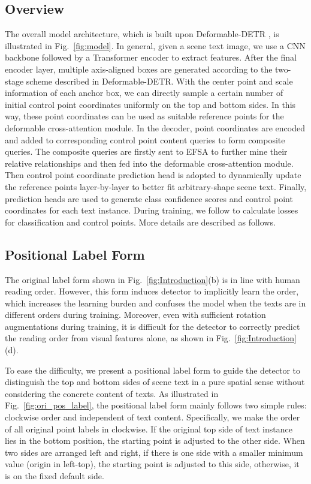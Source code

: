 \documentclass[letterpaper]{article} \usepackage{aaai23}  \usepackage{times}  \usepackage{helvet}  \usepackage{courier}  \usepackage[hyphens]{url}  \usepackage{graphicx} \urlstyle{rm}
\begin{document}
\subsection{Overview}
The overall model architecture, which is built upon Deformable-DETR \cite{zhu2020deformable}, is illustrated in Fig.~\ref{fig:model}. In general, given a scene text image, we use a CNN backbone followed by a Transformer encoder to extract features.
After the final encoder layer, multiple axis-aligned boxes are generated according to the two-stage scheme described in Deformable-DETR. With the center point and scale information of each anchor box, we can directly sample a certain number of initial control point coordinates uniformly on the top and bottom sides. In this way, these point coordinates can be used as suitable reference points for the deformable cross-attention module.
In the decoder, point coordinates are encoded and added to corresponding control point content queries to form composite queries. The composite queries are firstly sent to EFSA to further mine their relative relationships and then fed into the deformable cross-attention module. Then control point coordinate prediction head is adopted to dynamically update the reference points layer-by-layer to better fit arbitrary-shape scene text. Finally, prediction heads are used to generate class confidence scores and  control point coordinates for each text instance. During training, we follow \cite{zhang2022text} to calculate losses for classification and control points. More details are described as follows.

\subsection{Positional Label Form}
\label{pos.label}
The original label form shown in Fig.~\ref{fig:Introduction}(b) is in line with human reading order. However, this form induces detector to implicitly learn the order, which increases the learning burden and confuses the model when the texts are in different orders during training. Moreover, even with sufficient rotation augmentations during training, it is difficult for the detector to correctly predict the reading order from visual features alone, as shown in Fig.~\ref{fig:Introduction}(d).

To ease the difficulty, we present a positional label form to guide the detector to distinguish the top and bottom sides of scene text in a pure spatial sense without considering the concrete content of texts. As illustrated in Fig.~\ref{fig:ori_pos_label}, the positional label form mainly follows two simple rules: clockwise order and independent of text content. Specifically, we make the order of all original point labels in clockwise. If the original top side of text instance lies in the bottom position, the starting point is adjusted to the other side. When two sides are arranged left and right, if there is one side with a smaller minimum  value (origin in left-top), the starting point is adjusted to this side, otherwise, it is on the fixed default side.
\end{document}
